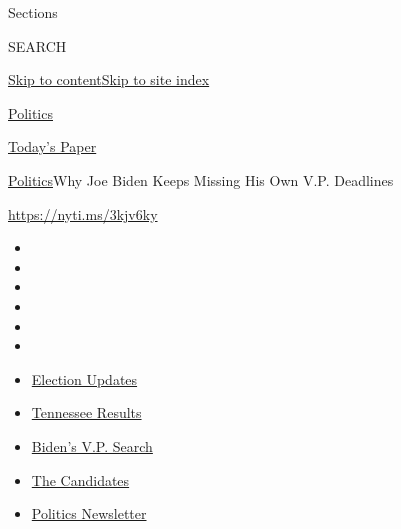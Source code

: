 Sections

SEARCH

\protect\hyperlink{site-content}{Skip to
content}\protect\hyperlink{site-index}{Skip to site index}

\href{https://www.nytimes3xbfgragh.onion/section/politics}{Politics}

\href{https://myaccount.nytimes3xbfgragh.onion/auth/login?response_type=cookie\&client_id=vi}{}

\href{https://www.nytimes3xbfgragh.onion/section/todayspaper}{Today's
Paper}

\href{/section/politics}{Politics}\textbar{}Why Joe Biden Keeps Missing
His Own V.P. Deadlines

\url{https://nyti.ms/3kjv6ky}

\begin{itemize}
\item
\item
\item
\item
\item
\item
\end{itemize}

\begin{itemize}
\item
  \href{https://www.nytimes3xbfgragh.onion/2020/08/07/us/elections/biden-vs-trump.html?action=click\&pgtype=Article\&state=default\&region=TOP_BANNER\&context=storylines_menu}{Election
  Updates}
\item
  \href{https://www.nytimes3xbfgragh.onion/interactive/2020/08/06/us/elections/results-tennessee-primary-elections.html?action=click\&pgtype=Article\&state=default\&region=TOP_BANNER\&context=storylines_menu}{Tennessee
  Results}
\item
  \href{https://www.nytimes3xbfgragh.onion/article/biden-vice-president-2020.html?action=click\&pgtype=Article\&state=default\&region=TOP_BANNER\&context=storylines_menu}{Biden's
  V.P. Search}
\item
  \href{https://www.nytimes3xbfgragh.onion/interactive/2019/us/politics/2020-presidential-candidates.html?action=click\&pgtype=Article\&state=default\&region=TOP_BANNER\&context=storylines_menu}{The
  Candidates}
\item
  \href{https://www.nytimes3xbfgragh.onion/newsletters/politics?action=click\&pgtype=Article\&state=default\&region=TOP_BANNER\&context=storylines_menu}{Politics
  Newsletter}
\end{itemize}

